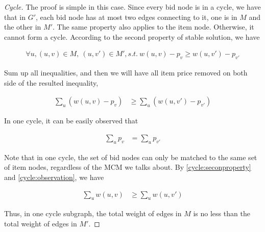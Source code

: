 \documentclass[11pt,a4paper]{article}
\begin{document}
\begin{proof}[Cycle]

    The proof is simple in this case. Since every bid node is in a cycle, we
    have that in $G'$, each bid node has at most two edges connecting to it,
    one is in $M$ and the other in $M'$. The same property also applies to the
    item node. Otherwise, it cannot form a cycle.
    According to the second property of stable solution, we have 

    \begin{align}
        \forall u, (u,v) \in M,\ (u, v') \in M', s.t.\  w(u, v) - p_v \geq w(u, v') - p_{v'}
    \end{align}

    Sum up all inequalities, and then we will have all item price removed on
    both side of the resulted inequality, 

    \begin{align} \label{cycle:seconproperty}
        \sum_{u} ( w(u, v) - p_v) & \geq \sum_{u} ( w(u, v') - p_{v'} ) 
    \end{align}
    
    In one cycle, it can be easily observed that 

    \begin{align} \label{cycle:observation}
        \sum_{u} p_v & = \sum_{u}  p_{v'}
    \end{align}

    Note that in one cycle, the set of bid nodes can only be matched to the
    same set of item nodes, regardless of the MCM we talks about. By \eqref{cycle:seconproperty}
    and \eqref{cycle:observation}, we have

    \begin{align}
        \sum_{u} w(u, v) & \geq \sum_{u}  w(u, v')
    \end{align}

    Thus, in one cycle subgraph, the total weight of edges in $M$ is no less
    than the total weight of edges in $M'$.

\end{proof}
\end{document}
